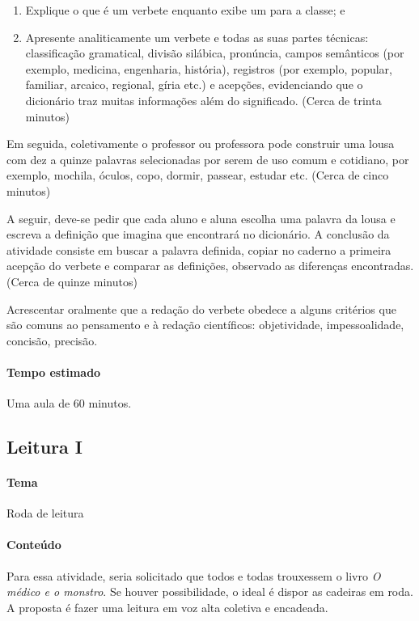 \documentclass[12pt]{extarticle}
\begin{document}
{\begin{enumerate}
\item
Explique o que é um verbete enquanto exibe um para a classe; e

\item
Apresente analiticamente um verbete e todas as suas partes técnicas:
classificação gramatical, divisão silábica, pronúncia, campos semânticos
(por exemplo, medicina, engenharia, história), registros (por exemplo,
popular, familiar, arcaico, regional, gíria etc.) e acepções,
evidenciando que o dicionário traz muitas informações além do
significado. (Cerca de trinta minutos)
\end{enumerate}

Em seguida, coletivamente o professor ou professora pode construir uma
lousa com dez a quinze palavras selecionadas por serem de uso comum e
cotidiano, por exemplo, mochila, óculos, copo, dormir, passear, estudar
etc. (Cerca de cinco minutos)

A seguir, deve-se pedir que cada aluno e aluna escolha uma palavra da
lousa e escreva a definição que imagina que encontrará no dicionário. A
conclusão da atividade consiste em buscar a palavra definida, copiar no
caderno a primeira acepção do verbete e comparar as definições,
observado as diferenças encontradas. (Cerca de quinze minutos)

Acrescentar oralmente que a redação do verbete obedece a alguns
critérios que são comuns ao pensamento e à redação científicos:
objetividade, impessoalidade, concisão, precisão.

\paragraph{Tempo estimado} Uma aula de 60 minutos.

\subsection{Leitura I}

\paragraph{Tema} Roda de leitura


\paragraph{Conteúdo}
Para essa atividade, seria solicitado que todos e todas trouxessem o
livro \emph{O médico e o monstro}. Se houver possibilidade, o ideal é
dispor as cadeiras em roda. A proposta é fazer uma leitura em voz alta
coletiva e encadeada.

}
\end{document}
